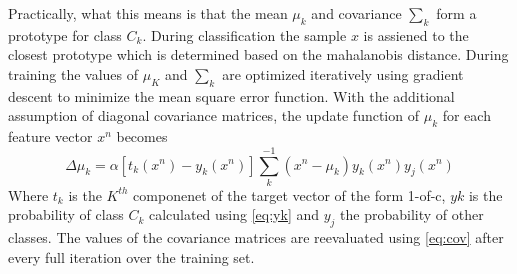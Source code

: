 \documentclass[12pt, a4paper, fleqn]{memoir}%
\begin{document}
Practically, what this means is that the mean $\mu_k$ and covariance $\sum_k$ form a prototype for class $C_k$. During classification the sample $x$ is assiened to the closest prototype which is determined based on the mahalanobis distance. During training the values of $\mu_K$ and $\sum_k$ are optimized iteratively using gradient descent to minimize the mean square error function. With the additional assumption of diagonal covariance matrices, the update function of $\mu_k$ for each feature vector $x^n$ becomes
\begin{equation} \label{eq:deltamu}
	\Delta \mu_k = \alpha[t_k(x^n)-y_k(x^n)]\sum_k^{-1}(x^n-\mu_k)y_k(x^n)y_j(x^n)
\end{equation}
Where $t_k$ is the $K^{th}$ componenet of the target vector of the form 1-of-c, $yk$ is the probability of class $C_k$ calculated using \ref{eq:yk} and $y_j$ the probability of other classes. The values of the covariance matrices are reevaluated using \ref{eq:cov} after every full iteration over the training set.
\end{document}
